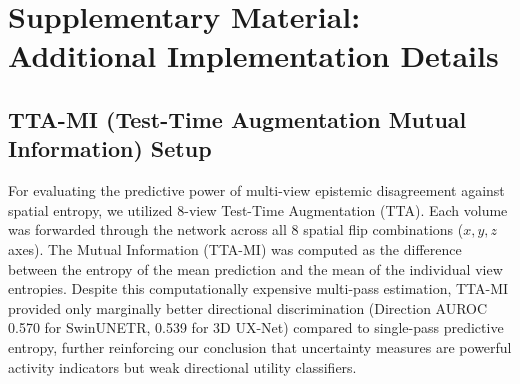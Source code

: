 \documentclass[final,5p,times,twocolumn]{elsarticle}
\begin{document}
\section*{Supplementary Material: Additional Implementation Details}

\subsection*{TTA-MI (Test-Time Augmentation Mutual Information) Setup}
For evaluating the predictive power of multi-view epistemic disagreement against spatial entropy, we utilized 8-view Test-Time Augmentation (TTA). Each volume was forwarded through the network across all 8 spatial flip combinations ($x, y, z$ axes). The Mutual Information (TTA-MI) was computed as the difference between the entropy of the mean prediction and the mean of the individual view entropies. Despite this computationally expensive multi-pass estimation, TTA-MI provided only marginally better directional discrimination (Direction AUROC 0.570 for SwinUNETR, 0.539 for 3D UX-Net) compared to single-pass predictive entropy, further reinforcing our conclusion that uncertainty measures are powerful activity indicators but weak directional utility classifiers.
\end{document}
